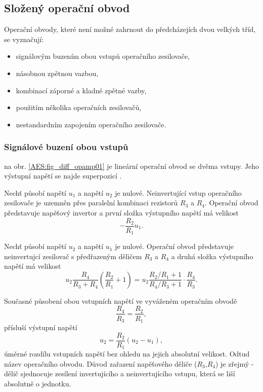 {    \subsection{Složený operační obvod}
      Operační obvody, které není možné zahrnout do předcházejích dvou velkých tříd, se vyznačují:
        \begin{itemize}\addtolength{\itemsep}{-0.5\baselineskip}
          \item signálovým buzením obou vstupů operačního zesilovače,
          \item násobnou zpětnou vazbou,
          \item kombinací záporné a kladné zpětné vazby,
          \item použitím několika operačních zesilovačů,
          \item nestandardním zapojením operačního zesilovače.
        \end{itemize}
      \subsubsection{Signálové buzení obou vstupů}
         na obr. \ref{AES:fig_diff_opamp01} je lineární operační obvod se dvěma vstupy. Jeho výstupní napětí se najde superpozicí \cite[s.~126]{Dostal}. 
        
        Nechť působí napětí $u_1$ a napětí $u_2$ je nulové. Neinvertující vstup operačního 
        zesilovače je uzemněn přes paralelní kombinaci rezistorů $R_3$ a $R_4$. Operační obvod 
        představuje napěťový invertor a první složka výstupního napětí má velikost 
        $$-\frac{R_2}{R_1}u_1.$$
        
        Nechť působí napětí $u_2$ a napětí $u_1$ je nulové. Operační obvod představuje neinvertujcí 
        zesilovač s předřazeným děličem $R_3$ a $R_4$ a druhá složka výstupního napětí má velikost 
        $$u_2\frac{R_4}{R_3+R_4}\left(\frac{R_2}{R_1}+1\right)= 
        u_2\frac{R_2/R_1+1}{R_4/R_3+1}\cdot\frac{R_4}{R_3}.$$
        
         
               
        Současné působení obou vstupních napětí ve vyváženém operačním obvodě $$\frac{R_4}{R_3}=\frac{R_2}{R_1},$$ přísluší výstupní napětí 
        \begin{equation}\label{AES:eq_diff_opamp}
          u_2 = \frac{R_2}{R_1}(u_2-u_1),   
        \end{equation}
        úměrné rozdílu vstupních napětí bez ohledu na jejich absolutní velikost. Odtud název 
        operačního obvodu. Důvod zařazení napěťového děliče ($R_3$,$R_4$) je zřejmý - dělič 
        sjednocuje zesílení invertujícího a neinvertujícího vstupu, která se liší absolutně o 
        jednotku. 
        
}
